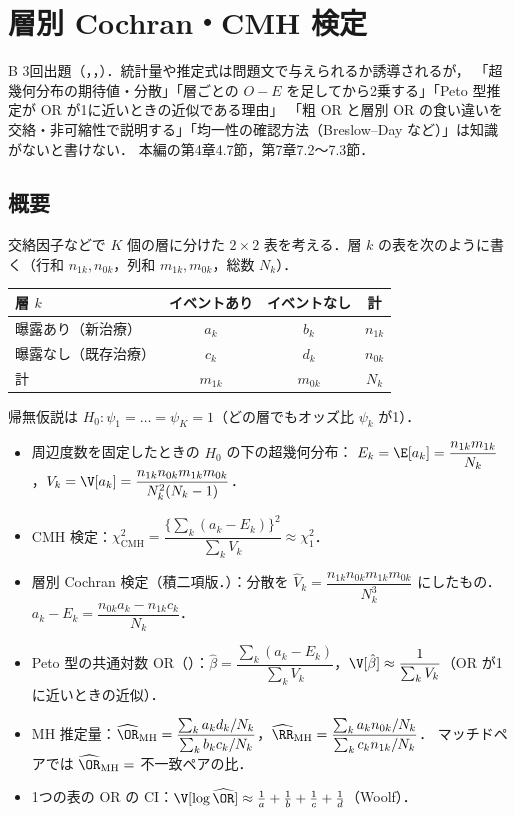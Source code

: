 \chapter{層別 Cochran・CMH 検定}\label{ch:m07}

\begin{priobox}{B}
3回出題（，，）．統計量や推定式は問題文で与えられるか誘導されるが，
「超幾何分布の期待値・分散」「層ごとの $O-E$ を足してから2乗する」「Peto 型推定が OR が1に近いときの近似である理由」
「粗 OR と層別 OR の食い違いを交絡・非可縮性で説明する」「均一性の確認方法（Breslow--Day など）」は知識がないと書けない．
本編の第4章4.7節，第7章7.2〜7.3節．
\end{priobox}

\section{概要}\label{sec:m07-gaiyo}
交絡因子などで $K$ 個の層に分けた $2\times2$ 表を考える．層 $k$ の表を次のように書く（行和 $n_{1k},n_{0k}$，列和 $m_{1k},m_{0k}$，総数 $N_k$）．
\begin{center}\small
\begin{tabular}{@{}lccc@{}}
\toprule
層 $k$ & イベントあり & イベントなし & 計\\
\midrule
曝露あり（新治療） & $a_k$ & $b_k$ & $n_{1k}$\\
曝露なし（既存治療） & $c_k$ & $d_k$ & $n_{0k}$\\
\midrule
計 & $m_{1k}$ & $m_{0k}$ & $N_k$\\
\bottomrule
\end{tabular}
\end{center}
帰無仮説は $H_0:\psi_1=\dots=\psi_K=1$（どの層でもオッズ比 $\psi_k$ が1）．
\begin{pointbox}[覚える式]
\begin{itemize}
\item 周辺度数を固定したときの $H_0$ の下の超幾何分布：
      $E_k=\E[a_k]=\dfrac{n_{1k}m_{1k}}{N_k}$，\quad $V_k=\V[a_k]=\dfrac{n_{1k}n_{0k}m_{1k}m_{0k}}{N_k^2(N_k-1)}$．
\item CMH 検定：$\chi^2_{\mathrm{CMH}}=\dfrac{\{\sum_k(a_k-E_k)\}^2}{\sum_kV_k}\approx\chi^2_1$．
\item 層別 Cochran 検定（積二項版．）：分散を $\hat V_k=\dfrac{n_{1k}n_{0k}m_{1k}m_{0k}}{N_k^3}$ にしたもの．$a_k-E_k=\dfrac{n_{0k}a_k-n_{1k}c_k}{N_k}$．
\item Peto 型の共通対数 OR（）：$\hat\beta=\dfrac{\sum_k(a_k-E_k)}{\sum_kV_k}$，$\V[\hat\beta]\approx\dfrac1{\sum_kV_k}$（OR が1に近いときの近似）．
\item MH 推定量：$\widehat\OR_{\mathrm{MH}}=\dfrac{\sum_ka_kd_k/N_k}{\sum_kb_kc_k/N_k}$，\quad $\widehat\RR_{\mathrm{MH}}=\dfrac{\sum_ka_kn_{0k}/N_k}{\sum_kc_kn_{1k}/N_k}$．
      マッチドペアでは $\widehat\OR_{\mathrm{MH}}=$ 不一致ペアの比．
\item 1つの表の OR の CI：$\V[\log\widehat\OR]\approx\frac1a+\frac1b+\frac1c+\frac1d$（Woolf）．
\end{itemize}
\end{pointbox}

